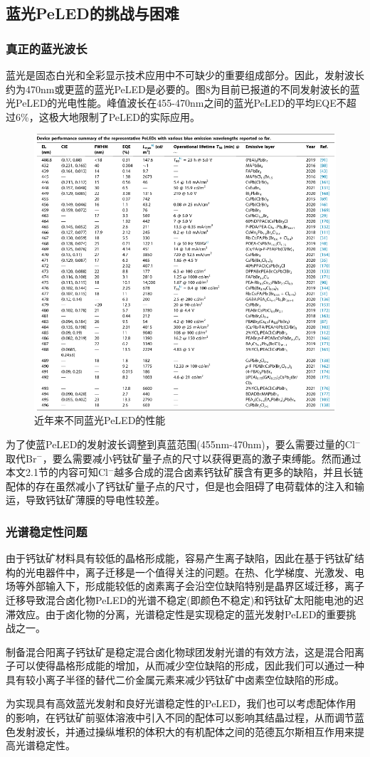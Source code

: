 \documentclass{phyasgn}\usepackage{nag}
\begin{document}
\subsection{蓝光PeLED的挑战与困难}
\subsubsection{真正的蓝光波长}
蓝光是固态白光和全彩显示技术应用中不可缺少的重要组成部分。因此，发射波长约为470nm或更蓝的蓝光PeLED是必要的。图8为目前已报道的不同发射波长的蓝光PeLED的光电性能。峰值波长在455-470nm之间的蓝光PeLED的平均EQE不超过6\%，这极大地限制了PeLED的实际应用。
	\begin{figure}[H]
		\centering
		\hspace{2em}\includegraphics[width=.8\linewidth]{pic/10.png}
        \caption{近年来不同蓝光PeLED的性能\cite{zhang2021blue}}
	\end{figure}
\par 为了使蓝PeLED的发射波长调整到真蓝范围(455nm-470nm)，要么需要过量的Cl$^-$取代Br$^-$，要么需要减小钙钛矿量子点的尺寸以获得更高的激子束缚能。然而通过本文2.1节的内容可知Cl$^-$越多合成的混合卤素钙钛矿膜含有更多的缺陷，并且长链配体的存在虽然减小了钙钛矿量子点的尺寸，但是也会阻碍了电荷载体的注入和输运，导致钙钛矿薄膜的导电性较差。
\subsubsection{光谱稳定性问题}
\par 由于钙钛矿材料具有较低的晶格形成能\cite{pan2019halogen}，容易产生离子缺陷，因此在基于钙钛矿结构的光电器件中，离子迁移是一个值得关注的问题。在热、化学梯度、光激发、电场等外部输入下，形成能较低的卤素离子会沿空位缺陷特别是晶界区域迁移，离子迁移导致混合卤化物PeLED的光谱不稳定(即颜色不稳定)和钙钛矿太阳能电池的迟滞效应\cite{xiao2017efficient}。由于卤化物的分离，光谱稳定性是实现稳定的蓝光发射PeLED的重要挑战之一。
\par 制备混合阳离子钙钛矿是稳定混合卤化物球团发射光谱的有效方法，这是混合阳离子可以使得晶格形成能的增加，从而减少空位缺陷的形成，因此我们可以通过一种具有较小离子半径的替代二价金属元素来减少钙钛矿中卤素空位缺陷的形成。
\par 为实现具有高效蓝光发射和良好光谱稳定性的PeLED，我们也可以考虑配体作用的影响，在钙钛矿前驱体溶液中引入不同的配体可以影响其结晶过程，从而调节蓝色发射波长，并通过操纵堆积的体积大的有机配体之间的范德瓦尔斯相互作用来提高光谱稳定性。
\end{document}
